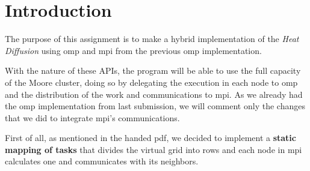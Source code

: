 \documentclass[../main.tex]{subfiles}
\begin{document}
\section{Introduction}

The purpose of this assignment is to make a hybrid implementation of the \textit{Heat Diffusion} using \acrfull{omp} and \acrfull{mpi}\cite{BibEntry2025May} from the previous \acrshort{omp} implementation.

With the nature of these APIs, the program will be able to use the full capacity of the Moore cluster, doing so by delegating the execution in each node to \acrshort{omp} and the distribution of the work and communications to \acrshort{mpi}.
As we already had the \acrshort{omp} implementation from last submission, we will comment only the changes that we did to integrate \acrshort{mpi}'s communications.

First of all, as mentioned in the handed \acrshort{pdf}, we decided to implement a \textbf{static mapping of tasks} that divides the virtual grid into rows and each node in \acrshort{mpi} calculates one and communicates with its neighbors.
\end{document}
